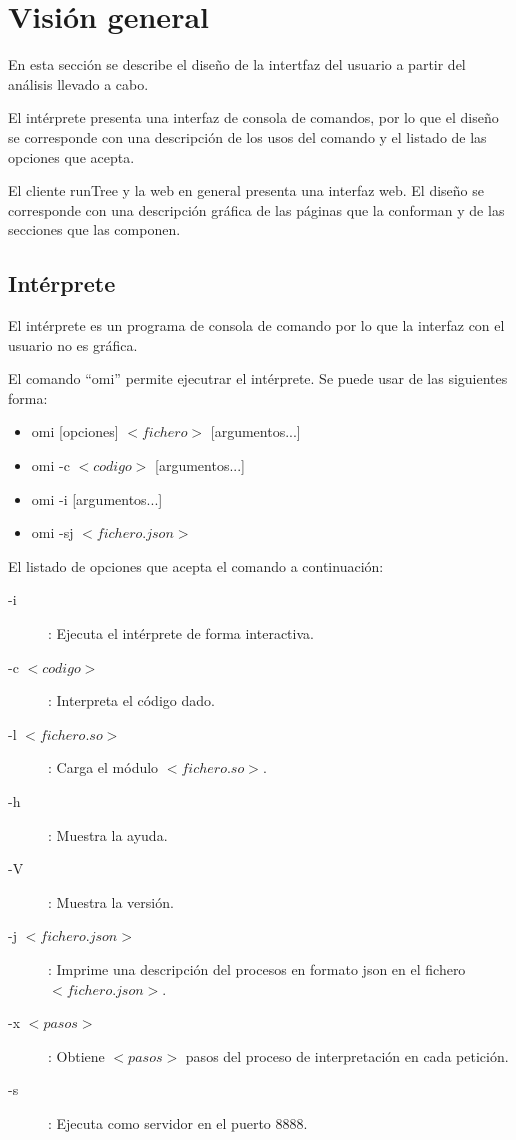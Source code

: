 \section{Visión general}
En esta sección se describe el diseño de la intertfaz del usuario a partir del análisis llevado a cabo.

El intérprete presenta una interfaz de consola de comandos, por lo que el diseño se corresponde con una descripción de los usos 
del comando y el listado de las opciones que acepta.

El cliente runTree y la web en general presenta una interfaz web. El diseño se corresponde con una descripción 
gráfica de las páginas que la conforman y de las secciones que las componen.
\subsection{Intérprete}
El intérprete es un programa de consola de comando por lo que la interfaz con el usuario no es gráfica.

El comando ``omi'' permite ejecutrar el intérprete. Se puede usar de las siguientes forma:
\begin{itemize}
   \item omi [opciones] $<fichero>$ [argumentos...]
   \item omi -c $<codigo>$ [argumentos...]
   \item omi -i [argumentos...]
   \item omi -sj $<fichero.json>$
\end{itemize}

El listado de opciones que acepta el comando a continuación:

\begin{description}
\item[-i	]:	Ejecuta el intérprete de forma interactiva.
 \item [-c $<codigo>$]:	Interpreta el código dado.
 \item [-l $<fichero.so>$]: Carga el módulo $<fichero.so>$.
\item [-h]: Muestra la ayuda.
 \item[-V]: Muestra la versión.
\item [-j $<fichero.json>$]: Imprime una descripción del procesos en formato json en el fichero $<fichero.json>$.
  \item [-x $<pasos>$]: Obtiene $<pasos>$ pasos del proceso de interpretación en cada petición. 
 \item [-s]:	Ejecuta como servidor en el puerto 8888.
\end {description}

